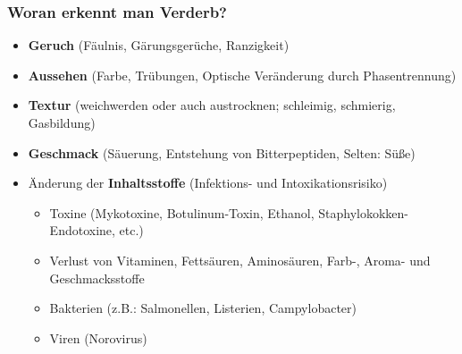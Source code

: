 \documentclass[a4paper,10pt,twoside]{article}
\begin{document}
\subsubsection{Woran erkennt man Verderb?}
\begin{itemize}
\item \textbf{Geruch} (Fäulnis, Gärungsgerüche, Ranzigkeit)
\item \textbf{Aussehen} (Farbe, Trübungen, Optische Veränderung durch Phasentrennung)
\item \textbf{Textur} (weichwerden oder auch austrocknen; schleimig, schmierig, Gasbildung)
\item \textbf{Geschmack} (Säuerung, Entstehung von Bitterpeptiden, Selten: Süße)
\item Änderung der \textbf{Inhaltsstoffe} (Infektions- und Intoxikationsrisiko)
\begin{itemize}
\item Toxine (Mykotoxine, Botulinum-Toxin, Ethanol, Staphylokokken-Endotoxine, etc.)
\item Verlust von Vitaminen, Fettsäuren, Aminosäuren, Farb-, Aroma- und Geschmacksstoffe
\item Bakterien (z.B.: Salmonellen, Listerien, Campylobacter)
\item Viren (Norovirus)
\end{itemize}
\end{itemize}

\end{document}
